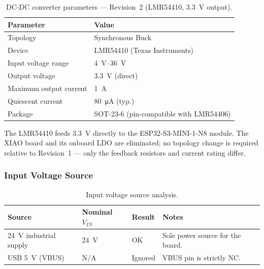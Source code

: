\begin{table}[H]
  \caption{DC-DC converter parameters — Revision~2 (LMR54410, \SI{3.3}{\volt} output).}
  \label{tab:converter_rev2}
  \centering
  \begin{tabularx}{\textwidth}{|X|X|}
    \hline
    \textbf{Parameter} & \textbf{Value} \\ \hline \hline
    Topology            & Synchronous Buck \\ \hline
    Device              & LMR54410 (Texas Instruments) \\ \hline
    Input voltage range & \SI{4}{\volt}--\SI{36}{\volt} \\ \hline
    Output voltage      & \SI{3.3}{\volt} (direct) \\ \hline
    Maximum output current & \SI{1}{\ampere} \\ \hline
    Quiescent current   & \SI{80}{\micro\ampere} (typ.) \\ \hline
    Package             & SOT-23-6 (pin-compatible with LMR54406) \\ \hline
  \end{tabularx}
\end{table}

The LMR54410 feeds \SI{3.3}{\volt} directly to the ESP32-S3-MINI-1-N8 module.
The XIAO board and its onboard \ac{LDO} are eliminated; no topology change is required relative to Revision~1 — only the feedback resistors and current rating differ.

\subsubsection{Input Voltage Source}
\label{sec:input_voltage}

\begin{table}[H]
  \caption{Input voltage source analysis.}
  \label{tab:input_voltage}
  \centering
  \begin{tabularx}{\textwidth}{|X|X|X|X|}
    \hline
    \textbf{Source} & \textbf{Nominal $V_{IN}$} & \textbf{Result} & \textbf{Notes} \\ \hline \hline
    \SI{24}{\volt} industrial supply & \SI{24}{\volt} & OK      & Sole power source for the board. \\ \hline
    \ac{USB} \SI{5}{\volt} (VBUS)    & N/A             & Ignored & VBUS pin is strictly \ac{NC}. \\ \hline
  \end{tabularx}
\end{table}

